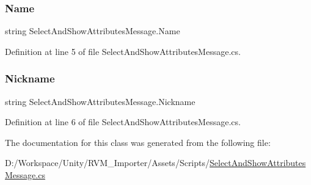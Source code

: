 \subsubsection{\texorpdfstring{Name}{Name}}
{\footnotesize\ttfamily string Select\+And\+Show\+Attributes\+Message.\+Name}



Definition at line 5 of file Select\+And\+Show\+Attributes\+Message.\+cs.

\mbox{\label{class_select_and_show_attributes_message_ad52a961dedef874b0dd19e6b5b2a9d97}} 
\subsubsection{\texorpdfstring{Nickname}{Nickname}}
{\footnotesize\ttfamily string Select\+And\+Show\+Attributes\+Message.\+Nickname}



Definition at line 6 of file Select\+And\+Show\+Attributes\+Message.\+cs.



The documentation for this class was generated from the following file\+:\begin{DoxyCompactItemize}
\item 
D\+:/\+Workspace/\+Unity/\+R\+V\+M\+\_\+\+Importer/\+Assets/\+Scripts/\mbox{\hyperlink{_select_and_show_attributes_message_8cs}{Select\+And\+Show\+Attributes\+Message.\+cs}}\end{DoxyCompactItemize}
